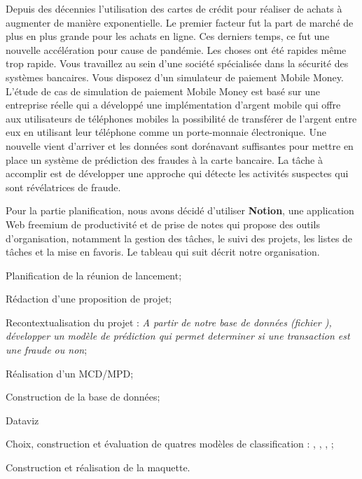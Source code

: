 \begingroup
\renewcommand{\cleardoublepage}{}
\clearpage
{}
\endgroup

Depuis des décennies l'utilisation des cartes de crédit pour réaliser de achats à augmenter de
manière exponentielle. Le premier facteur fut la part de marché de plus en plus grande pour
les achats en ligne. Ces derniers temps, ce fut une nouvelle accélération pour cause de
pandémie. Les choses ont été rapides même trop rapide. \nextpar
Vous travaillez au sein d'une société spécialisée dans la sécurité des systèmes bancaires.
Vous disposez d'un simulateur de paiement Mobile Money.
L'étude de cas de simulation de paiement Mobile Money est basé sur une entreprise réelle
qui a développé une implémentation d'argent mobile qui offre aux utilisateurs de téléphones
mobiles la possibilité de transférer de l'argent entre eux en utilisant leur téléphone comme un
porte-monnaie électronique. \nextpar
Une nouvelle vient d'arriver et les données sont dorénavant suffisantes pour mettre en place
un système de prédiction des fraudes à la carte bancaire.
La tâche à accomplir est de développer une approche qui détecte les activités suspectes qui
sont révélatrices de fraude.

    Pour la partie planification, nous avons décidé d'utiliser \textbf{Notion}, une application Web freemium de productivité et de prise de notes qui propose des outils d'organisation, notamment la gestion des tâches, le suivi des projets, les listes de tâches et la mise en favoris.
    Le tableau qui suit décrit notre organisation.
    \begin{arabic-enum}
        \item Planification de la réunion de lancement;
        \item Rédaction d'une proposition de projet;
        \item Recontextualisation du projet : \emph{A partir de notre base de données (fichier ), développer un modèle de prédiction qui permet determiner si une transaction est une fraude ou non};
        \item Réalisation d'un MCD/MPD;
        \item Construction de la base de données;
        \item Dataviz
        \item Choix, construction et évaluation de quatres modèles de classification : , , , ;
        \item Construction et réalisation de la maquette.
    \end{arabic-enum}
